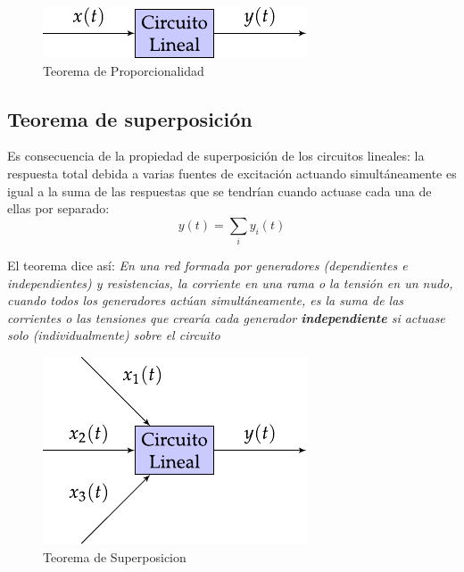 \begin{figure}[H]
  \centering
  \includegraphics{../figs/proporcionalidad.pdf}
  \caption{Teorema de Proporcionalidad}
  \label{fig:superposicion_cc}
\end{figure}

\subsection{Teorema de superposición}
\label{sec:superposicion}

Es consecuencia de la propiedad de superposición de los circuitos
lineales: la respuesta total debida a varias fuentes de
excitación actuando simultáneamente es igual a la suma de las
respuestas que se tendrían cuando actuase cada una de ellas por
separado:
\begin{equation*}
  y(t) = \sum_i y_i(t)
\end{equation*}
    
El teorema dice así: \textit{En una red formada por generadores
  (dependientes e independientes) y resistencias, la corriente en una
  rama o la tensión en un nudo, cuando todos los generadores actúan
  simultáneamente, es la suma de las corrientes o las tensiones que
  crearía cada generador \textbf{independiente} si actuase solo
  (individualmente) sobre el circuito}

\begin{figure}[H]
  \centering
  \includegraphics{../figs/superposicion.pdf}
  \caption{Teorema de Superposicion}
  \label{fig:superposicion}
\end{figure}

